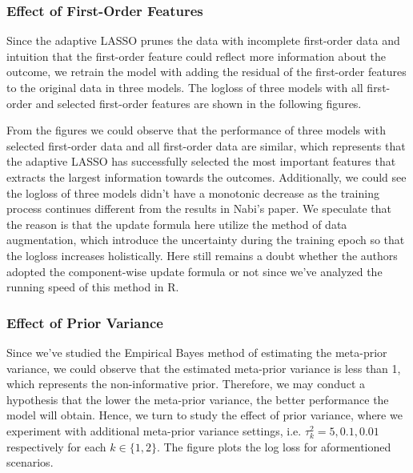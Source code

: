 \documentclass{article}
\begin{document}
\subsubsection{Effect of First-Order Features}
Since the adaptive LASSO prunes the data with incomplete first-order data and intuition that the first-order feature could reflect more information about the outcome, we retrain the model with adding the residual of the first-order features to the original data in three models. The logloss of three models with all first-order and selected first-order features are shown in the following figures.

\begin{figure}
  \centering
\end{figure}

From the figures we could observe that the performance of three models with selected first-order data and all first-order data are similar, which represents that the adaptive LASSO has successfully selected the most important features that extracts the largest information towards the outcomes. Additionally, we could see the logloss of three models didn't have a monotonic decrease as the training process continues different from the results in \cite{BEB} Nabi's paper. We speculate that the reason is that the update formula here utilize the method of data augmentation, which introduce the uncertainty during the training epoch so that the logloss increases holistically. Here still remains a doubt whether the authors adopted the component-wise update formula or not since we've analyzed the running speed of this method in R.

\subsubsection{Effect of Prior Variance}

Since we've studied the Empirical Bayes method of estimating the meta-prior variance, we could observe that the estimated meta-prior variance is less than 1, which represents the non-informative prior. Therefore, we may conduct a hypothesis that the lower the meta-prior variance, the better performance the model will obtain. Hence, we turn to study the effect of prior variance, where we experiment with additional meta-prior variance settings, i.e. $\tau_k^2 = 5,0.1,0.01$ respectively for each $k \in \{1,2\}$. The figure plots the log loss for aformentioned scenarios.
\end{document}
